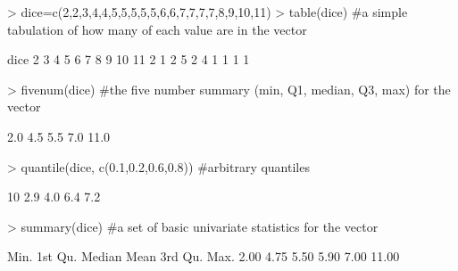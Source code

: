 \documentclass[12pt]{article}
\begin{document}
\begin{Schunk}
\begin{Sinput}
> dice=c(2,2,3,4,4,5,5,5,5,5,6,6,7,7,7,7,8,9,10,11)
> table(dice) #a simple tabulation of how many of each value are in the vector
\end{Sinput}
\begin{Soutput}
dice
 2  3  4  5  6  7  8  9 10 11 
 2  1  2  5  2  4  1  1  1  1 
\end{Soutput}
\begin{Sinput}
> fivenum(dice) #the five number summary (min, Q1, median, Q3, max) for the vector
\end{Sinput}
\begin{Soutput}
[1]  2.0  4.5  5.5  7.0 11.0
\end{Soutput}
\begin{Sinput}
> quantile(dice, c(0.1,0.2,0.6,0.8)) #arbitrary quantiles
\end{Sinput}
\begin{Soutput}
10% 20% 60% 80% 
2.9 4.0 6.4 7.2 
\end{Soutput}
\begin{Sinput}
> summary(dice) #a set of basic univariate statistics for the vector
\end{Sinput}
\begin{Soutput}
   Min. 1st Qu.  Median    Mean 3rd Qu.    Max. 
   2.00    4.75    5.50    5.90    7.00   11.00 
\end{Soutput}
\end{Schunk}
\end{document}
